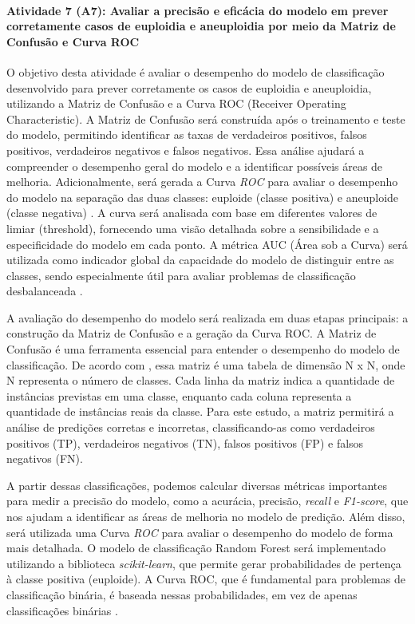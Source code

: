 \paragraph{\textbf{Atividade 7 (A7):} Avaliar a precisão e eficácia do modelo em prever corretamente casos de euploidia e aneuploidia  por meio da Matriz de Confusão e Curva ROC}

O objetivo desta atividade é avaliar o desempenho do modelo de classificação desenvolvido para prever corretamente os casos de euploidia e aneuploidia, utilizando a Matriz de Confusão e a Curva ROC (Receiver Operating Characteristic). A Matriz de Confusão será construída após o treinamento e teste do modelo, permitindo identificar as taxas de verdadeiros positivos, falsos positivos, verdadeiros negativos e falsos negativos. Essa análise ajudará a compreender o desempenho geral do modelo e a identificar possíveis áreas de melhoria. Adicionalmente, será gerada a Curva \textit{ROC} para avaliar o desempenho do modelo na separação das duas classes: euploide (classe positiva) e aneuploide (classe negativa) \cite{vilela2022}. A curva será analisada com base em diferentes valores de limiar (threshold), fornecendo uma visão detalhada sobre a sensibilidade e a especificidade do modelo em cada ponto. A métrica AUC (Área sob a Curva) será utilizada como indicador global da capacidade do modelo de distinguir entre as classes, sendo especialmente útil para avaliar problemas de classificação desbalanceada \cite{vilela2022}.

A avaliação do desempenho do modelo será realizada em duas etapas principais: a construção da Matriz de Confusão e a geração da Curva ROC. A Matriz de Confusão é uma ferramenta essencial para entender o desempenho do modelo de classificação. De acordo com , essa matriz é uma tabela de dimensão N x N, onde N representa o número de classes. Cada linha da matriz indica a quantidade de instâncias previstas em uma classe, enquanto cada coluna representa a quantidade de instâncias reais da classe. Para este estudo, a matriz permitirá a análise de predições corretas e incorretas, classificando-as como verdadeiros positivos (TP), verdadeiros negativos (TN), falsos positivos (FP) e falsos negativos (FN). 

A partir dessas classificações, podemos calcular diversas métricas importantes para medir a precisão do modelo, como a acurácia, precisão, \textit{recall} e \textit{F1-score}, que nos ajudam a identificar as áreas de melhoria no modelo de predição. Além disso, será utilizada uma Curva \textit{ROC} para avaliar o desempenho do modelo de forma mais detalhada. O modelo de classificação Random Forest será implementado utilizando a biblioteca \textit{scikit-learn}, que permite gerar probabilidades de pertença à classe positiva (euploide). A Curva ROC, que é fundamental para problemas de classificação binária, é baseada nessas probabilidades, em vez de apenas classificações binárias \cite{vilela2022}. 

